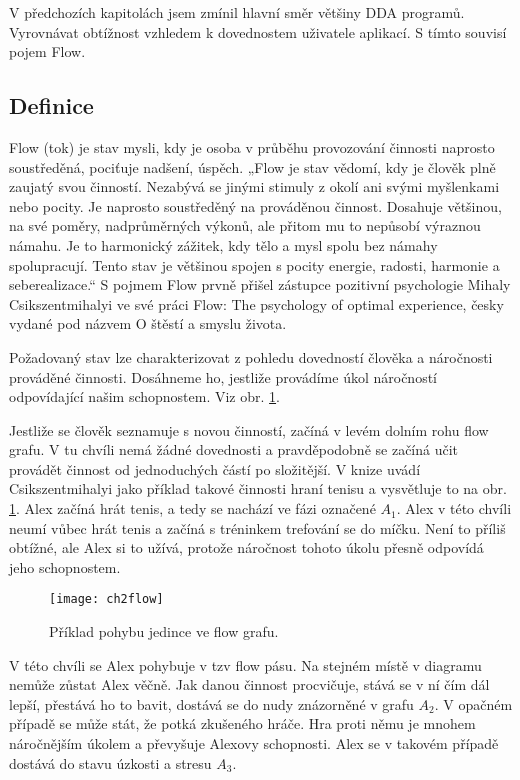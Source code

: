 V předchozích kapitolách jsem zmínil hlavní směr většiny DDA programů. Vyrovnávat obtížnost vzhledem k dovednostem uživatele aplikací. S tímto souvisí pojem Flow.

\subsection{Definice}

Flow (tok) je stav mysli, kdy je osoba v průběhu provozování činnosti naprosto soustředěná, pociťuje nadšení, úspěch. „Flow je stav vědomí, kdy je člověk plně zaujatý svou činností. Nezabývá se jinými stimuly z okolí ani svými myšlenkami nebo pocity. Je naprosto soustředěný na prováděnou činnost. Dosahuje většinou, na své poměry, nadprůměrných výkonů, ale přitom mu to nepůsobí výraznou námahu. Je to harmonický zážitek, kdy tělo a mysl spolu bez námahy spolupracují. Tento stav je většinou spojen s pocity energie, radosti, harmonie a seberealizace.“ \cite{FlowCZ} S pojmem Flow prvně přišel zástupce pozitivní psychologie Mihaly Csikszentmihalyi ve své práci Flow: The psychology of optimal experience, česky vydané pod názvem O štěstí a smyslu života.

Požadovaný stav lze charakterizovat z pohledu dovedností člověka a náročnosti prováděné činnosti. Dosáhneme ho, jestliže provádíme úkol náročností odpovídající našim schopnostem. Viz obr. \ref{fig:ch2flow}. 

Jestliže se člověk seznamuje s novou činností, začíná v levém dolním rohu flow grafu. V tu chvíli nemá žádné dovednosti a pravděpodobně se začíná učit provádět činnost od jednoduchých částí po složitější. V knize \cite{OptimalFun} uvádí Csikszentmihalyi jako příklad takové činnosti hraní tenisu a vysvětluje to na obr. \ref{fig:ch2flow}. Alex začíná hrát tenis, a tedy se nachází ve fázi označené $A_1$. Alex v této chvíli neumí vůbec hrát tenis a začíná s tréninkem trefování se do míčku. Není to příliš obtížné, ale Alex si to užívá, protože náročnost tohoto úkolu přesně odpovídá jeho schopnostem.

\begin{figure}
  \centering
  \texttt{[image: ch2flow]}
	\caption{Příklad pohybu jedince ve flow grafu. \cite{OptimalFun} }
	\label{fig:ch2flow}
\end{figure}

V této chvíli se Alex pohybuje v tzv flow pásu. Na stejném místě v diagramu nemůže zůstat Alex věčně. Jak danou činnost procvičuje, stává se v ní čím dál lepší, přestává ho to bavit, dostává se do nudy znázorněné v grafu $A_2$. V opačném případě se může stát, že potká zkušeného hráče. Hra proti němu je mnohem náročnějším úkolem a převyšuje Alexovy schopnosti. Alex se v takovém případě dostává do stavu úzkosti a stresu $A_3$.

